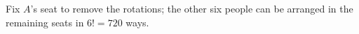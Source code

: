 Fix $A$'s seat to remove the rotations; the other six people can be arranged in the remaining seats in $6!=\boxed{720}$ ways.
